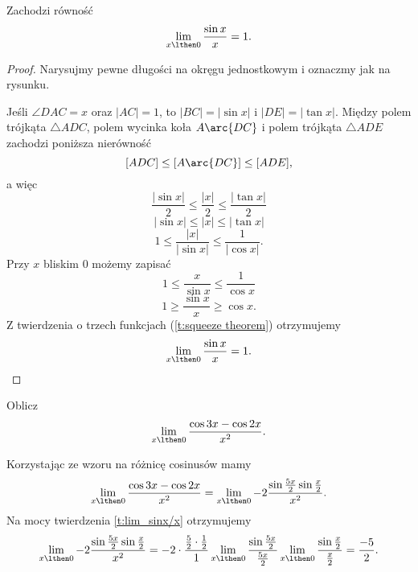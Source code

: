 \documentclass[11pt]{scrartcl}
\begin{document}
    \begin{theorem}
        \label{t:lim_sinx/x}
        Zachodzi równość
        \[ \lim_{x \lthen 0}\frac{\sin{x}}{x} = 1. \]
    \end{theorem}
    \begin{proof}
        Narysujmy pewne długości na okręgu jednostkowym i oznaczmy jak na rysunku.
        \begin{center}
        \end{center}
        Jeśli $\angle DAC = x$ oraz $|AC| = 1$, to $|BC| = |\sin x|$ i $|DE| = |\tan x|$. Między polem trójkąta $\triangle ADC$, polem wycinka koła $A\arc{DC}$ i polem trójkąta $\triangle ADE$ zachodzi poniższa nierówność
        \[ [ADC] \leq [A\arc{DC}] \leq [ADE], \]
        a więc
        \[ \frac{|\sin x|}{2} \leq \frac{|x|}{2} \leq \frac{|\tan x|}{2} \]
        \[ |\sin x| \leq |x| \leq |\tan x| \]
        \[ 1 \leq \frac{|x|}{|\sin{x}|} \leq \frac{1}{|\cos x|}. \]
        Przy $x$ bliskim $0$ możemy zapisać
        \[ 1 \leq \frac{x}{\sin{x}} \leq \frac{1}{\cos x} \]
        \[ 1 \geq \frac{\sin{x}}{x} \geq \cos x. \]
        Z twierdzenia o trzech funkcjach (\ref{t:squeeze theorem}) otrzymujemy
        \[ \lim_{x \lthen 0} \frac{\sin{x}}{x} = 1. \]
    \end{proof}

    \begin{example}
        Oblicz
        \[ \lim_{x \lthen 0} \frac{\cos{3x} - \cos{2x}}{x^2}. \]
    \end{example}
    \begin{solution}
        Korzystając ze wzoru na różnicę cosinusów mamy
        \[ \lim_{x \lthen 0} \frac{\cos{3x} - \cos{2x}}{x^2} = \lim_{x \lthen 0} -2\frac{\sin\frac{5x}{2}\sin\frac{x}{2}}{x^2}. \]
        Na mocy twierdzenia \ref{t:lim_sinx/x} otrzymujemy
        \[ \lim_{x \lthen 0} -2\frac{\sin\frac{5x}{2}\sin\frac{x}{2}}{x^2} = -2\cdot\frac{\frac{5}{2}\cdot\frac{1}{2}}{1}\lim_{x\lthen 0}\frac{\sin\frac{5x}{2}}{\frac{5x}{2}}\lim_{x\lthen 0}\frac{\sin\frac{x}{2}}{\frac{x}{2}} =  \frac{-5}{2}. \]
    \end{solution}
\end{document}
